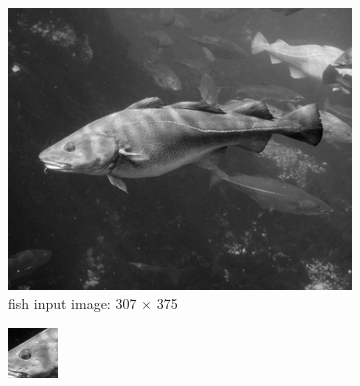 \begin{enumerate}[(a)]
\begin{figure}[htbp]
    \centering
    \begin{subfigure}[htbp]{0.24\textwidth}
        \centering
        \includegraphics[width=\textwidth]{fish.png}
        \caption{fish input image: 307 $\times$ 375}
        \label{fish}
    \end{subfigure}
    \hfill
    \begin{subfigure}[htbp]{0.24\textwidth}
        \centering
        \includegraphics[width=\textwidth]{filter_fish.png}

\end{subfigure}
\end{figure}
\end{enumerate}
